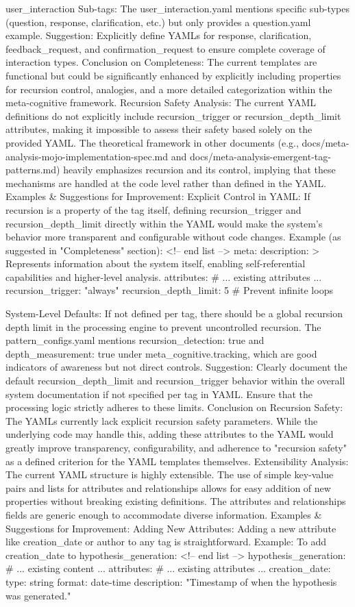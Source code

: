 user_interaction Sub-tags: The user_interaction.yaml mentions specific sub-types (question, response, clarification, etc.) but only provides a question.yaml example.
Suggestion: Explicitly define YAMLs for response, clarification, feedback_request, and confirmation_request to ensure complete coverage of interaction types. Conclusion on Completeness: The current templates are functional but could be significantly enhanced by explicitly including properties for recursion control, analogies, and a more detailed categorization within the meta-cognitive framework.
Recursion Safety Analysis: The current YAML definitions do not explicitly include recursion_trigger or recursion_depth_limit attributes, making it impossible to assess their safety based solely on the provided YAML. The theoretical framework in other documents (e.g., docs/meta-analysis-mojo-implementation-spec.md and docs/meta-analysis-emergent-tag-patterns.md) heavily emphasizes recursion and its control, implying that these mechanisms are handled at the code level rather than defined in the YAML. Examples & Suggestions for Improvement:
Explicit Control in YAML: If recursion is a property of the tag itself, defining recursion_trigger and recursion_depth_limit directly within the YAML would make the system's behavior more transparent and configurable without code changes.
Example (as suggested in "Completeness" section): <!-- end list --> meta: description: > Represents information about the system itself, enabling self-referential capabilities and higher-level analysis. attributes: # ... existing attributes ... recursion_trigger: "always" recursion_depth_limit: 5 # Prevent infinite loops

System-Level Defaults: If not defined per tag, there should be a global recursion depth limit in the processing engine to prevent uncontrolled recursion. The pattern_configs.yaml mentions recursion_detection: true and depth_measurement: true under meta_cognitive.tracking, which are good indicators of awareness but not direct controls.
Suggestion: Clearly document the default recursion_depth_limit and recursion_trigger behavior within the overall system documentation if not specified per tag in YAML. Ensure that the processing logic strictly adheres to these limits. Conclusion on Recursion Safety: The YAMLs currently lack explicit recursion safety parameters. While the underlying code may handle this, adding these attributes to the YAML would greatly improve transparency, configurability, and adherence to "recursion safety" as a defined criterion for the YAML templates themselves.
Extensibility Analysis: The current YAML structure is highly extensible. The use of simple key-value pairs and lists for attributes and relationships allows for easy addition of new properties without breaking existing definitions. The attributes and relationships fields are generic enough to accommodate diverse information. Examples & Suggestions for Improvement:
Adding New Attributes: Adding a new attribute like creation_date or author to any tag is straightforward.
Example: To add creation_date to hypothesis_generation: <!-- end list --> hypothesis_generation: # ... existing content ... attributes: # ... existing attributes ... creation_date: type: string format: date-time description: "Timestamp of when the hypothesis was generated."

